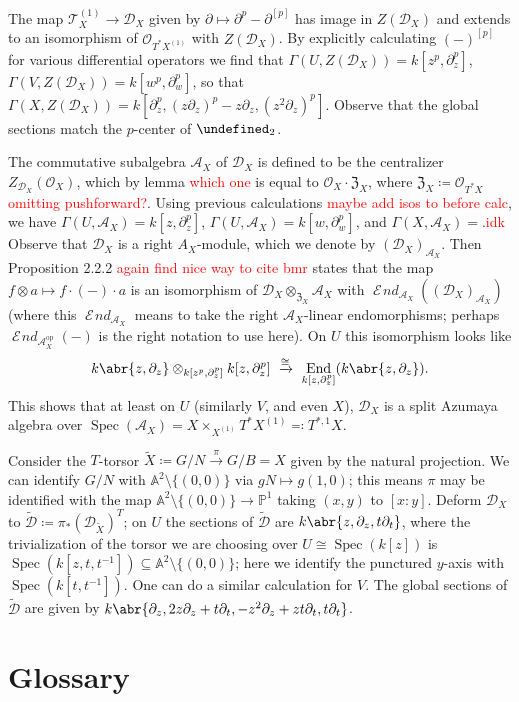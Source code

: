 \documentclass[11pt,leqno]{article}
\newcommand{\sai}[1]{\textcolor{red}{#1}}
\theoremstyle{plain}
\theoremstyle{definition}
\numberwithin{equation}{section}
\numberwithin{lem}{section}
\let\sl\undefined
\DeclareMathOperator{\sl}{\mathfrak{sl}}
\DeclareMathOperator{\Ends}{\mathcal{E}\!\mathit{nd}}
\renewcommand{\op}{\mathrm{op}}
\DeclareMathOperator{\End}{End}
\DeclareMathOperator{\Spec}{Spec}
\begin{document}
The map $\mathcal T_X^{(1)}\to \mathcal D_X$ given by $\partial \mapsto \partial^p-\partial^{[p]}$ has image in $Z(\mathcal D_X)$ and extends to an isomorphism of $\mathcal O_{T^\ast X^{(1)}}$ with $Z(\mathcal D_X)$. By explicitly calculating $(-)^{[p]}$ for various differential operators we find that $\Gamma(U,Z(\mathcal D_X)) = k[z^p,\partial_z^p]$, $\Gamma(V,Z(\mathcal D_X)) = k[w^p,\partial_w^p]$, so that $\Gamma(X,Z(\mathcal D_X)) = k[\partial_z^p, (z\partial_z)^p-z\partial_z, (z^2\partial_z)^p]$. Observe that the global sections match the $p$-center of $\sl_2$.

The commutative subalgebra $\mathcal A_X$ of $\mathcal D_X$ is defined to be the centralizer $Z_{\mathcal D_X}(\mathcal O_X)$, which by lemma \sai{which one} is equal to $\mathcal O_X\cdot \mathfrak Z_X$, where $\mathfrak Z_X\coloneqq \mathcal O_{T^\ast X}$\sai{omitting pushforward?}. Using previous calculations \sai{maybe add isos to before calc}, we have $\Gamma(U,\mathcal A_X) = k[z,\partial_z^p]$, $\Gamma(U,\mathcal A_X) = k[w,\partial_w^p]$, and $\Gamma(X,\mathcal A_X) = $.\sai{idk} Observe that $\mathcal D_X$ is a right $A_X$-module, which we denote by $(\mathcal D_X)_{\mathcal A_X}$. Then Proposition 2.2.2 \sai{again find nice way to cite bmr} states that the map $f\otimes a\mapsto f\cdot (-)\cdot a$ is an isomorphism of $\mathcal D_X\otimes_{\mathfrak Z_X}\mathcal A_X$ with $\Ends_{\mathcal A_X}((\mathcal D_X)_{\mathcal A_X})$ (where this $\Ends_{\mathcal A_X}$ means to take the right $\mathcal A_X$-linear endomorphisms; perhaps $\Ends_{\mathcal A_X^\op}(-)$ is the right notation to use here). On $U$ this isomorphism looks like 
\[k\abr{z,\partial_z}\otimes_{k[z^p,\partial_z^p]}k[z,\partial_z^p]\xrightarrow{\cong}\End_{k[z,\partial_z^p]}(k\abr{z,\partial_z}).\]
This shows that at least on $U$ (similarly $V$, and even $X$), $\mathcal D_X$ is a split Azumaya algebra over $\Spec(\mathcal A_X) = X\times_{X^{(1)}}T^\ast X^{(1)}\eqqcolon T^{\ast,1}X$.

Consider the $T$-torsor $\widetilde X\coloneqq G/N\xrightarrow{\pi}G/B = X$ given by the natural projection. We can identify $G/N$ with $\mathbb A^2\setminus\{(0,0)\}$ via $gN\mapsto g(1,0)$; this means $\pi$ may be identified with the map $\mathbb A^2\setminus\{(0,0)\}\to\mathbb P^1$ taking $(x,y)$ to $[x:y]$. Deform $\mathcal D_X$ to $\widetilde{\mathcal D}\coloneqq \pi_\ast(\mathcal D_{\widetilde X})^T$; on $U$ the sections of $\widetilde{\mathcal D}$ are $k\abr{z,\partial_z, t\partial_t}$, where the trivialization of the torsor we are choosing over $U\cong \Spec(k[z])$ is $\Spec(k[z,t,t^{-1}])\subseteq \mathbb A^2\setminus\{(0,0)\}$; here we identify the punctured $y$-axis with $\Spec(k[t,t^{-1}])$. One can do a similar calculation for $V$. The global sections of $\widetilde{\mathcal D}$ are given by $k\abr{\partial_z, 2z\partial_z+t\partial_t, -z^2\partial_z+zt\partial_t, t\partial_t}$.
\newpage
\section*{Glossary}
\label{glossary}
\end{document}
